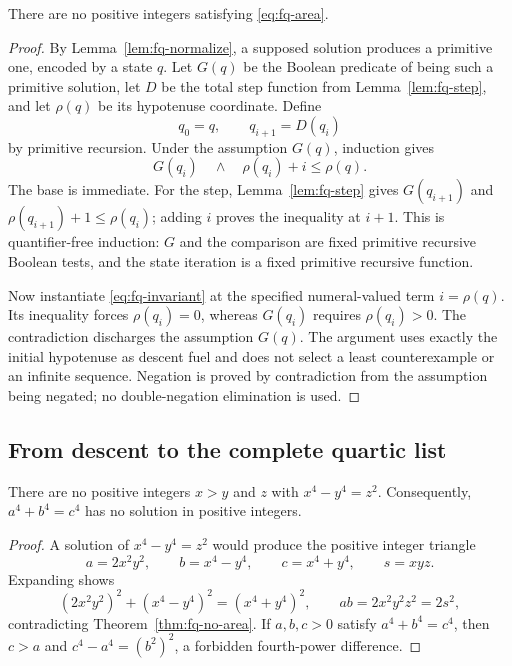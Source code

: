 \begin{theorem}
\label{thm:fq-no-area}
There are no positive integers satisfying \eqref{eq:fq-area}.
\end{theorem}

\begin{proof}
By Lemma~\ref{lem:fq-normalize}, a supposed solution produces a
primitive one, encoded by a state $q$.  Let $G(q)$ be the Boolean
predicate of being such a primitive solution, let $D$ be the total
step function from Lemma~\ref{lem:fq-step}, and let $\rho(q)$ be its
hypotenuse coordinate.  Define
\[
 q_0=q,\qquad q_{i+1}=D(q_i)
\]
by primitive recursion.  Under the assumption $G(q)$, induction gives
\[
 G(q_i)\quad\wedge\quad \rho(q_i)+i\leq\rho(q).
 \tag{F8}\label{eq:fq-invariant}
\]
The base is immediate.  For the step, Lemma~\ref{lem:fq-step} gives
$G(q_{i+1})$ and
$\rho(q_{i+1})+1\leq\rho(q_i)$; adding $i$ proves the inequality
at $i+1$.  This is quantifier-free induction: $G$ and the comparison
are fixed primitive recursive Boolean tests, and the state iteration
is a fixed primitive recursive function.

Now instantiate \eqref{eq:fq-invariant} at the specified numeral-valued
term $i=\rho(q)$.  Its inequality forces $\rho(q_i)=0$, whereas
$G(q_i)$ requires $\rho(q_i)>0$.  The contradiction discharges the
assumption $G(q)$.  The argument uses exactly the initial hypotenuse
as descent fuel and does not select a least counterexample or an
infinite sequence.  Negation is proved by contradiction from the
assumption being negated; no double-negation elimination is used.
\end{proof}

\subsection{From descent to the complete quartic list}

\begin{lemma}\label{lem:fq-difference}
There are no positive integers $x>y$ and $z$ with $x^4-y^4=z^2$.
Consequently, $a^4+b^4=c^4$ has no solution in positive integers.
\end{lemma}

\begin{proof}
A solution of $x^4-y^4=z^2$ would produce the positive integer
triangle
\[
 a=2x^2y^2,\qquad b=x^4-y^4,\qquad c=x^4+y^4,
 \qquad s=xyz.
\]
Expanding shows
\[
 (2x^2y^2)^2+(x^4-y^4)^2=(x^4+y^4)^2,
 \qquad ab=2x^2y^2z^2=2s^2,
\]
contradicting Theorem~\ref{thm:fq-no-area}.
If $a,b,c>0$ satisfy $a^4+b^4=c^4$, then $c>a$ and
$c^4-a^4=(b^2)^2$, a forbidden fourth-power difference.
\end{proof}

